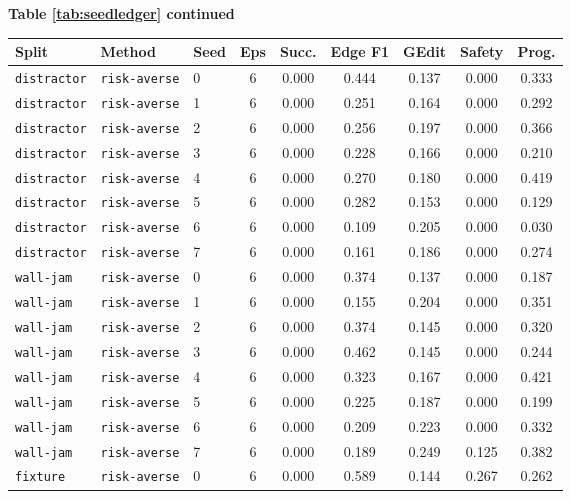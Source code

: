 \documentclass{article}
\begin{document}
\begin{center}
\textbf{Table \ref{tab:seedledger} continued}\\[0.4ex]
\begin{tabular}{lllcccccc}
\toprule
Split & Method & Seed & Eps & Succ. & Edge F1 & GEdit & Safety & Prog. \\
\midrule
\texttt{distractor} & \texttt{risk-averse} & 0 & 6 & 0.000 & 0.444 & 0.137 & 0.000 & 0.333 \\
\texttt{distractor} & \texttt{risk-averse} & 1 & 6 & 0.000 & 0.251 & 0.164 & 0.000 & 0.292 \\
\texttt{distractor} & \texttt{risk-averse} & 2 & 6 & 0.000 & 0.256 & 0.197 & 0.000 & 0.366 \\
\texttt{distractor} & \texttt{risk-averse} & 3 & 6 & 0.000 & 0.228 & 0.166 & 0.000 & 0.210 \\
\texttt{distractor} & \texttt{risk-averse} & 4 & 6 & 0.000 & 0.270 & 0.180 & 0.000 & 0.419 \\
\texttt{distractor} & \texttt{risk-averse} & 5 & 6 & 0.000 & 0.282 & 0.153 & 0.000 & 0.129 \\
\texttt{distractor} & \texttt{risk-averse} & 6 & 6 & 0.000 & 0.109 & 0.205 & 0.000 & 0.030 \\
\texttt{distractor} & \texttt{risk-averse} & 7 & 6 & 0.000 & 0.161 & 0.186 & 0.000 & 0.274 \\
\texttt{wall-jam} & \texttt{risk-averse} & 0 & 6 & 0.000 & 0.374 & 0.137 & 0.000 & 0.187 \\
\texttt{wall-jam} & \texttt{risk-averse} & 1 & 6 & 0.000 & 0.155 & 0.204 & 0.000 & 0.351 \\
\texttt{wall-jam} & \texttt{risk-averse} & 2 & 6 & 0.000 & 0.374 & 0.145 & 0.000 & 0.320 \\
\texttt{wall-jam} & \texttt{risk-averse} & 3 & 6 & 0.000 & 0.462 & 0.145 & 0.000 & 0.244 \\
\texttt{wall-jam} & \texttt{risk-averse} & 4 & 6 & 0.000 & 0.323 & 0.167 & 0.000 & 0.421 \\
\texttt{wall-jam} & \texttt{risk-averse} & 5 & 6 & 0.000 & 0.225 & 0.187 & 0.000 & 0.199 \\
\texttt{wall-jam} & \texttt{risk-averse} & 6 & 6 & 0.000 & 0.209 & 0.223 & 0.000 & 0.332 \\
\texttt{wall-jam} & \texttt{risk-averse} & 7 & 6 & 0.000 & 0.189 & 0.249 & 0.125 & 0.382 \\
\texttt{fixture} & \texttt{risk-averse} & 0 & 6 & 0.000 & 0.589 & 0.144 & 0.267 & 0.262 \\

\end{tabular}
\end{center}
\end{document}
